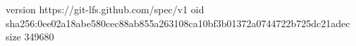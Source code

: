 version https://git-lfs.github.com/spec/v1
oid sha256:0ee02a18abe580cec88ab855a263108ca10bf3b01372a0744722b725dc21adec
size 349680
